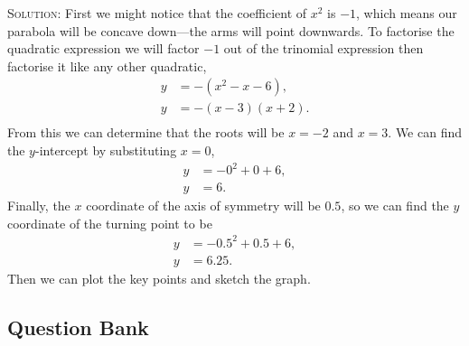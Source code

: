 \documentclass[a4paper,12pt]{article}
\begin{document}
\textsc{Solution}: First we might notice that the coefficient of $x^2$ is 
$-1$, which means our parabola will be concave down---the arms will point 
downwards. To factorise the quadratic expression we will factor $-1$ out 
of the trinomial expression then factorise it like any other quadratic,
\begin{align*}
y &= -(x^2 - x - 6), \\
y &= -(x - 3)(x + 2). \\
\end{align*}
From this we can determine that the roots will be $x = -2$ and $x = 3$.
We can find the $y$-intercept by substituting $x = 0$, 
\begin{align*}
y &= -0^2 + 0 + 6, \\
y &= 6.
\end{align*}
Finally, the $x$ coordinate of the axis of symmetry will be $0.5$, so we 
can find the $y$ coordinate of the turning point to be 
\begin{align*}
y &= -0.5^2 + 0.5 + 6, \\
y &= 6.25.
\end{align*}
Then we can plot the key points and sketch the graph.


\newpage
\subsection*{Question Bank}

\end{document}
